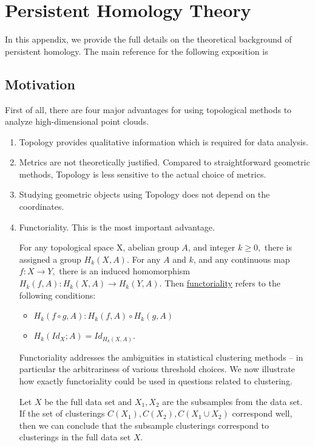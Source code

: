 \chapter{Persistent Homology Theory} 
\label{appendix-tda} 

In this appendix, we provide the full details on the theoretical background of persistent homology.
The main reference for the following exposition is \cite{carlsson_topology_2009}

\section{Motivation}

First of all, there are four major advantages for using topological methods to analyze high-dimensional point clouds.

\begin{enumerate}
	\item Topology provides qualitative information which is required for data analysis.
	
	\item Metrics are not theoretically justified. Compared to straightforward geometric methods, Topology is less sensitive to the actual choice of metrics. 
	
	\item Studying geometric objects using Topology does not depend on the coordinates. 
	
	\item Functoriality. This is the most important advantage.
	
	\begin{defn}[Functoriality]
	
		For any topological space X, abelian group $A$, and integer $k\geq 0,$ there is assigned a group $H_k(X,A).$ For any $A$ and $k$, and any continuous map $f: X \to Y,$ there is an induced homomorphism $H_k(f,A): H_k(X,A) \to H_k(Y,A).$ Then \underline{functoriality} refers to the following conditions:
		\begin{itemize}
			\item  $H_k(f\circ g,A): H_k(f,A) \circ H_k(g,A)$
			\item  $H_k(Id_{X};A) = Id_{H_k(X,A)}.$
		\end{itemize}
	\end{defn}
	Functoriality addresses the ambiguities in statistical clustering methods -- in particular the arbitrariness of various threshold choices. We now illustrate how exactly functoriality could be used in questions related to clustering. 
	
	Let $X$ be the full data set and $X_1,X_2$ are the subsamples from the data set. If the set of clusterings $C(X_1), C(X_2), C(X_1 \cup X_2)$ correspond well, then we can conclude that the subsample clusterings correspond to clusterings in the full data set $X$. 
\end{enumerate}

